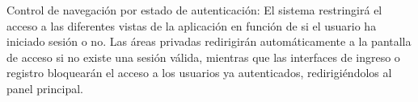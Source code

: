 \begin{functional}
    \item Control de navegación por estado de autenticación: El sistema restringirá el acceso a las diferentes vistas de la aplicación en función de si el usuario ha iniciado sesión o no. Las áreas privadas redirigirán automáticamente a la pantalla de acceso si no existe una sesión válida, mientras que las interfaces de ingreso o registro bloquearán el acceso a los usuarios ya autenticados, redirigiéndolos al panel principal.
\end{functional}